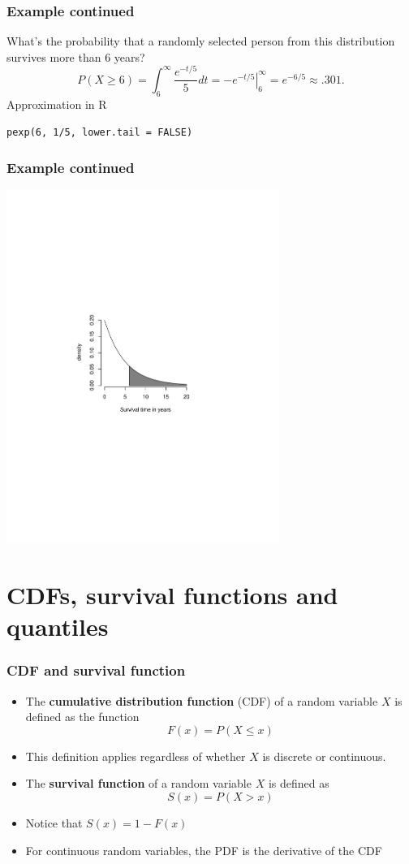 \documentclass{beamer}
\begin{document}
\begin{frame}
\frametitle{Example continued}
What's the probability that a randomly selected person from this distribution 
survives more than 6 years?
$$
P(X \geq 6) = \int_6^\infty  \frac{e^{-t/5}}{5}dt =  \left. -e^{-t/5} \right|_{6}^\infty = e^{-6/5} \approx .301.
$$
Approximation in R 
\begin{center}
  \texttt{pexp(6, 1/5, lower.tail = FALSE)}  
\end{center}
\end{frame}

\begin{frame}
\frametitle{Example continued}
   \includegraphics[width=3.5in]{exponential.pdf}
\end{frame}

\section{CDFs, survival functions and quantiles}
\begin{frame}
\frametitle{CDF and survival function}
\begin{itemize}
\item The {\bf cumulative distribution function} (CDF) of a random variable $X$
is defined as the function 
$$
F(x) = P(X \leq x)
$$
\item This definition applies regardless of whether $X$ is discrete or continuous.
\item The {\bf survival function} of a random variable $X$ is defined as
$$
S(x) = P(X > x)
$$
\item Notice that $S(x) = 1 - F(x)$
\item For continuous random variables, the PDF is the derivative of the CDF
\end{itemize}
\end{frame}
\end{document}
